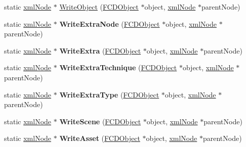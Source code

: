 \begin{DoxyCompactItemize}
\item 
static \hyperlink{struct__xmlNode}{xmlNode} $\ast$ \hyperlink{classFArchiveXML_aa13b1e22f3b07d1323b3961d3e6b4ada}{WriteObject} (\hyperlink{classFCDObject}{FCDObject} $\ast$object, \hyperlink{struct__xmlNode}{xmlNode} $\ast$parentNode)
\item 
\hypertarget{classFArchiveXML_a79f1ae05b3aea45004211bd02a093966}{
static \hyperlink{struct__xmlNode}{xmlNode} $\ast$ {\bfseries WriteExtraNode} (\hyperlink{classFCDObject}{FCDObject} $\ast$object, \hyperlink{struct__xmlNode}{xmlNode} $\ast$parentNode)}
\label{classFArchiveXML_a79f1ae05b3aea45004211bd02a093966}

\item 
\hypertarget{classFArchiveXML_a4ec98e3e1b99d04e2e4def4817184426}{
static \hyperlink{struct__xmlNode}{xmlNode} $\ast$ {\bfseries WriteExtra} (\hyperlink{classFCDObject}{FCDObject} $\ast$object, \hyperlink{struct__xmlNode}{xmlNode} $\ast$parentNode)}
\label{classFArchiveXML_a4ec98e3e1b99d04e2e4def4817184426}

\item 
\hypertarget{classFArchiveXML_a2835381fb0d57fb58b4cdf9a48ab51e5}{
static \hyperlink{struct__xmlNode}{xmlNode} $\ast$ {\bfseries WriteExtraTechnique} (\hyperlink{classFCDObject}{FCDObject} $\ast$object, \hyperlink{struct__xmlNode}{xmlNode} $\ast$parentNode)}
\label{classFArchiveXML_a2835381fb0d57fb58b4cdf9a48ab51e5}

\item 
\hypertarget{classFArchiveXML_a8ce4a97e018d56ed68f44aa32d0d527d}{
static \hyperlink{struct__xmlNode}{xmlNode} $\ast$ {\bfseries WriteExtraType} (\hyperlink{classFCDObject}{FCDObject} $\ast$object, \hyperlink{struct__xmlNode}{xmlNode} $\ast$parentNode)}
\label{classFArchiveXML_a8ce4a97e018d56ed68f44aa32d0d527d}

\item 
\hypertarget{classFArchiveXML_aa62412ae97a0a975224c39ee62842f4a}{
static \hyperlink{struct__xmlNode}{xmlNode} $\ast$ {\bfseries WriteScene} (\hyperlink{classFCDObject}{FCDObject} $\ast$object, \hyperlink{struct__xmlNode}{xmlNode} $\ast$parentNode)}
\label{classFArchiveXML_aa62412ae97a0a975224c39ee62842f4a}

\item 
\hypertarget{classFArchiveXML_a7929891047fb78e39ce44c0e5db43c86}{
static \hyperlink{struct__xmlNode}{xmlNode} $\ast$ {\bfseries WriteAsset} (\hyperlink{classFCDObject}{FCDObject} $\ast$object, \hyperlink{struct__xmlNode}{xmlNode} $\ast$parentNode)}
\label{classFArchiveXML_a7929891047fb78e39ce44c0e5db43c86}


\end{DoxyCompactItemize}
